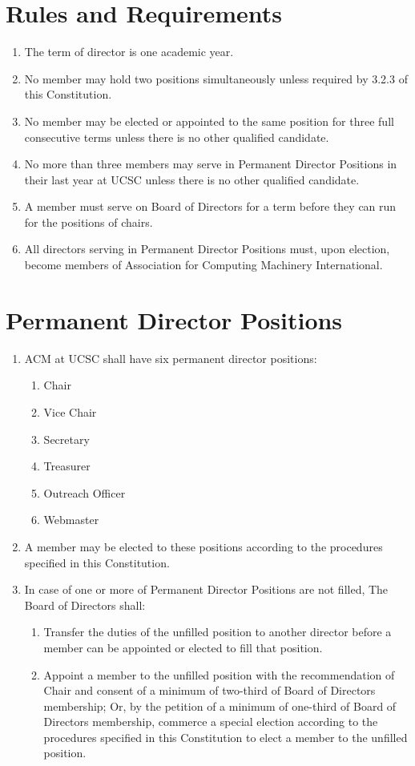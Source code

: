 
\section{Rules and Requirements}
\begin{enumerate}
	\item The term of director is one academic year.
	\item No member may hold two positions simultaneously unless required by 3.2.3 of this Constitution.
	\item No member may be elected or appointed to the same position for three full consecutive terms unless there is no other qualified candidate.
	\item No more than three members may serve in Permanent Director Positions in their last year at UCSC unless there is no other qualified candidate.
	\item A member must serve on Board of Directors for a term before they can run for the positions of chairs.
	\item All directors serving in Permanent Director Positions must, upon election, become members of Association for Computing Machinery International.
\end{enumerate}

\section{Permanent Director Positions}
\begin{enumerate}
	\item ACM at UCSC shall have six permanent director positions:
	\begin{enumerate}
		\item Chair
		\item Vice Chair
		\item Secretary
		\item Treasurer
		\item Outreach Officer
		\item Webmaster
	\end{enumerate}
	\item A member may be elected to these positions according to the procedures specified in this Constitution.
	\item In case of one or more of Permanent Director Positions are not filled, The Board of Directors shall:
	\begin{enumerate}
		\item Transfer the duties of the unfilled position to another director before a member can be appointed or elected to fill that position.
		\item Appoint a member to the unfilled position with the recommendation of Chair and consent of a minimum of two-third of Board of Directors membership; Or, by the petition of a minimum of one-third of Board of Directors membership, commerce a special election according to the procedures specified in this Constitution to elect a member to the unfilled position.
	\end{enumerate}
\end{enumerate}

